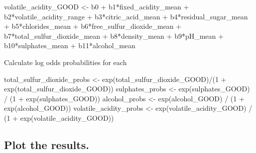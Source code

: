 \documentclass[
]{article}
\newenvironment{Shaded}{\begin{snugshade}}{\end{snugshade}}
\newcommand{\DecValTok}[1]{\textcolor[rgb]{0.00,0.00,0.81}{#1}}
\newcommand{\FunctionTok}[1]{\textcolor[rgb]{0.00,0.00,0.00}{#1}}
\newcommand{\NormalTok}[1]{#1}
\newcommand{\OtherTok}[1]{\textcolor[rgb]{0.56,0.35,0.01}{#1}}
\newcommand{\SpecialCharTok}[1]{\textcolor[rgb]{0.00,0.00,0.00}{#1}}
\begin{document}
\begin{Shaded}
\begin{Highlighting}[]
\NormalTok{volatile\_acidity\_GOOD }\OtherTok{\textless{}{-}}\NormalTok{ b0 }\SpecialCharTok{+}\NormalTok{ b1}\SpecialCharTok{*}\NormalTok{fixed\_acidity\_mean }\SpecialCharTok{+}\NormalTok{ b2}\SpecialCharTok{*}\NormalTok{volatile\_acidity\_range }\SpecialCharTok{+}
\NormalTok{  b3}\SpecialCharTok{*}\NormalTok{citric\_acid\_mean }\SpecialCharTok{+}\NormalTok{ b4}\SpecialCharTok{*}\NormalTok{residual\_sugar\_mean }\SpecialCharTok{+}\NormalTok{ b5}\SpecialCharTok{*}\NormalTok{chlorides\_mean }\SpecialCharTok{+}\NormalTok{ b6}\SpecialCharTok{*}\NormalTok{free\_sulfur\_dioxide\_mean }\SpecialCharTok{+}
\NormalTok{  b7}\SpecialCharTok{*}\NormalTok{total\_sulfur\_dioxide\_mean }\SpecialCharTok{+}\NormalTok{ b8}\SpecialCharTok{*}\NormalTok{density\_mean }\SpecialCharTok{+}\NormalTok{ b9}\SpecialCharTok{*}\NormalTok{pH\_mean }\SpecialCharTok{+}\NormalTok{ b10}\SpecialCharTok{*}\NormalTok{sulphates\_mean }\SpecialCharTok{+}\NormalTok{ b11}\SpecialCharTok{*}\NormalTok{alcohol\_mean}
\end{Highlighting}
\end{Shaded}

Calculate log odds probabilities for each

\begin{Shaded}
\begin{Highlighting}[]
\NormalTok{total\_sulfur\_dioxide\_probs }\OtherTok{\textless{}{-}} \FunctionTok{exp}\NormalTok{(total\_sulfur\_dioxide\_GOOD)}\SpecialCharTok{/}\NormalTok{(}\DecValTok{1} \SpecialCharTok{+} \FunctionTok{exp}\NormalTok{(total\_sulfur\_dioxide\_GOOD))}
\NormalTok{sulphates\_probs }\OtherTok{\textless{}{-}} \FunctionTok{exp}\NormalTok{(sulphates\_GOOD) }\SpecialCharTok{/}\NormalTok{ (}\DecValTok{1} \SpecialCharTok{+} \FunctionTok{exp}\NormalTok{(sulphates\_GOOD))}
\NormalTok{alcohol\_probs }\OtherTok{\textless{}{-}} \FunctionTok{exp}\NormalTok{(alcohol\_GOOD) }\SpecialCharTok{/}\NormalTok{ (}\DecValTok{1} \SpecialCharTok{+} \FunctionTok{exp}\NormalTok{(alcohol\_GOOD))}
\NormalTok{volatile\_acidity\_probs }\OtherTok{\textless{}{-}} \FunctionTok{exp}\NormalTok{(volatile\_acidity\_GOOD) }\SpecialCharTok{/}\NormalTok{ (}\DecValTok{1} \SpecialCharTok{+} \FunctionTok{exp}\NormalTok{(volatile\_acidity\_GOOD))}
\end{Highlighting}
\end{Shaded}

\hypertarget{plot-the-results.}{%
\subsection{Plot the results.}\label{plot-the-results.}}
\end{document}
